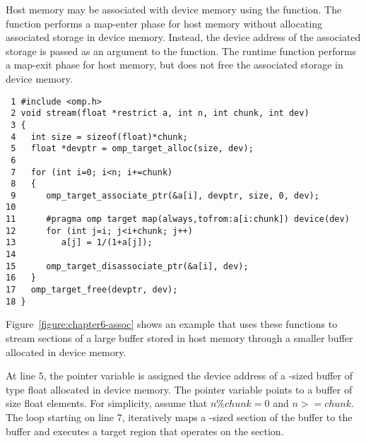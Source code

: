 Host memory may be associated with device memory using the  function.
The function performs a map-enter phase for host memory without allocating
associated storage in device memory.  Instead, the device address of the associated storage is passed
as an argument to the function.
The  runtime function
performs a map-exit phase for host memory, but does not free the associated
storage in device memory.  


\begin{figure*}[!tb]
\begin{verbatim}
 1 #include <omp.h>
 2 void stream(float *restrict a, int n, int chunk, int dev)
 3 {
 4   int size = sizeof(float)*chunk;
 5   float *devptr = omp_target_alloc(size, dev);
 6 
 7   for (int i=0; i<n; i+=chunk)
 8   {
 9      omp_target_associate_ptr(&a[i], devptr, size, 0, dev);
10 
11      #pragma omp target map(always,tofrom:a[i:chunk]) device(dev)
12      for (int j=i; j<i+chunk; j++)
13         a[j] = 1/(1+a[j]);
14 
15      omp_target_disassociate_ptr(&a[i], dev);
16   }
17   omp_target_free(devptr, dev);
18 }
\end{verbatim}
\caption{ \textbf {Map host memory to dynamically allocated device memory} -- \small
          Iteratively associate a smaller device memory buffer with a section
          of a larger \texttt{a} buffer.
         }
\label{figure:chapter6-assoc}
\end{figure*}

Figure~\ref{figure:chapter6-assoc} 
shows an example that uses these functions to stream sections of a large
buffer stored in host memory through a smaller buffer allocated in device
memory.


At line $5$, the pointer variable  is assigned the device address of
a -sized buffer of type float allocated in device memory.
The pointer variable  points to a buffer of size  float elements.  
For simplicity, assume that $n \% chunk = 0$ and $n >= chunk$.
The loop starting on line $7$, iteratively maps a -sized section of
the  buffer to the  buffer and executes a target region that
operates on the section.

